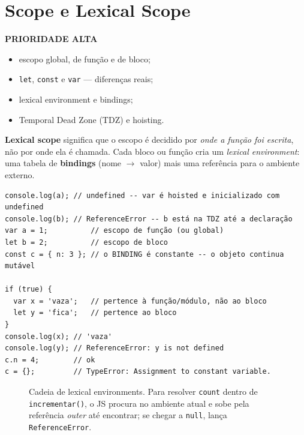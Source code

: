 \documentclass[12pt,a4paper,oneside]{book}
\newcommand{\alta}{\colorbox{red!15}{\sffamily\scriptsize\bfseries PRIORIDADE ALTA}}
\newcommand{\code}[1]{\texttt{#1}}
\begin{document}
\section{Scope e Lexical Scope}
\label{sec:scope}
\alta

\begin{itemize}
  \item escopo global, de função e de bloco;
  \item \code{let}, \code{const} e \code{var} --- diferenças reais;
  \item lexical environment e bindings;
  \item Temporal Dead Zone (TDZ) e hoisting.
\end{itemize}

\textbf{Lexical scope} significa que o escopo é decidido por \emph{onde a função foi escrita}, não por onde ela é chamada. Cada bloco ou função cria um \emph{lexical environment}: uma tabela de \textbf{bindings} (nome $\rightarrow$ valor) mais uma referência para o ambiente externo.

\begin{verbatim}
console.log(a); // undefined -- var é hoisted e inicializado com undefined
console.log(b); // ReferenceError -- b está na TDZ até a declaração
var a = 1;          // escopo de função (ou global)
let b = 2;          // escopo de bloco
const c = { n: 3 }; // o BINDING é constante -- o objeto continua mutável

if (true) {
  var x = 'vaza';   // pertence à função/módulo, não ao bloco
  let y = 'fica';   // pertence ao bloco
}
console.log(x); // 'vaza'
console.log(y); // ReferenceError: y is not defined
c.n = 4;        // ok
c = {};         // TypeError: Assignment to constant variable.
\end{verbatim}

\begin{figure}[h]
\centering
{}
\caption{Cadeia de lexical environments. Para resolver \texttt{count} dentro de \texttt{incrementar()}, o JS procura no ambiente atual e sobe pela referência \emph{outer} até encontrar; se chegar a \texttt{null}, lança \texttt{ReferenceError}.}
\end{figure}
\end{document}
